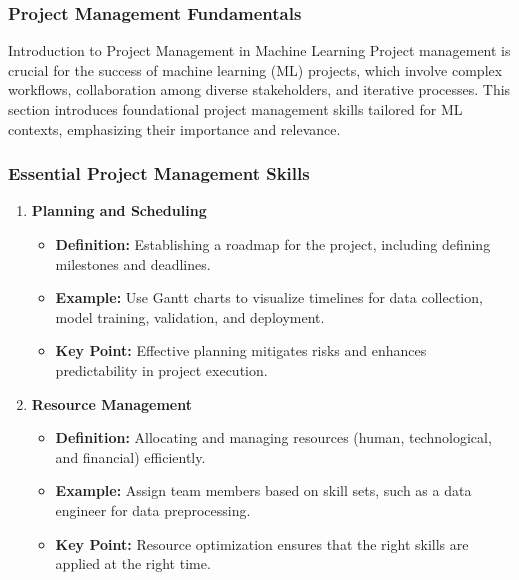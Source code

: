 \documentclass[aspectratio=169]{beamer}
\begin{document}
\begin{frame}[fragile]
    \frametitle{Project Management Fundamentals}
    \begin{block}{Introduction to Project Management in Machine Learning}
        Project management is crucial for the success of machine learning (ML) projects, which involve complex workflows, collaboration among diverse stakeholders, and iterative processes. This section introduces foundational project management skills tailored for ML contexts, emphasizing their importance and relevance.
    \end{block}
\end{frame}

\begin{frame}[fragile]
    \frametitle{Essential Project Management Skills}
    \begin{enumerate}
        \item \textbf{Planning and Scheduling}
            \begin{itemize}
                \item \textbf{Definition:} Establishing a roadmap for the project, including defining milestones and deadlines.
                \item \textbf{Example:} Use Gantt charts to visualize timelines for data collection, model training, validation, and deployment.
                \item \textbf{Key Point:} Effective planning mitigates risks and enhances predictability in project execution.
            \end{itemize}
        \item \textbf{Resource Management}
            \begin{itemize}
                \item \textbf{Definition:} Allocating and managing resources (human, technological, and financial) efficiently.
                \item \textbf{Example:} Assign team members based on skill sets, such as a data engineer for data preprocessing.
                \item \textbf{Key Point:} Resource optimization ensures that the right skills are applied at the right time.
            \end{itemize}
    \end{enumerate}
\end{frame}
\end{document}
